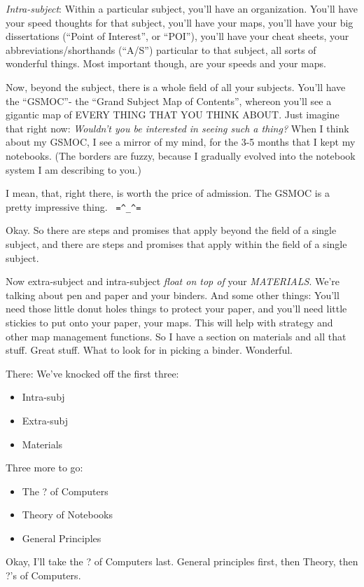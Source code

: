 \documentclass[oneside]{book}
\begin{document}
\emph{Intra-subject}: Within a particular subject, you'll have an
organization. You'll have your speed thoughts for that subject, you'll
have your maps, you'll have your big dissertations (``Point of
Interest'', or ``POI''), you'll have your cheat sheets, your
abbreviations/shorthands (``A/S'') particular to that subject, all sorts
of wonderful things. Most important though, are your speeds and your
maps.


Now, beyond the subject, there is a whole field of all your
subjects. You'll have the ``GSMOC''- the ``Grand Subject Map of
Contents'', whereon you'll see a gigantic map of EVERY THING THAT YOU
THINK ABOUT. Just imagine that right now: \emph{Wouldn't you be interested
in seeing such a thing?} When I think about my GSMOC, I see a mirror
of my mind, for the 3-5 months that I kept my notebooks. (The borders
are fuzzy, because I gradually evolved into the notebook system I am
describing to you.)

I mean, that, right there, is worth the price of admission. The GSMOC
is a pretty impressive thing. \verb| =^_^= |

Okay. So there are steps and promises that apply beyond the field of a
single subject, and there are steps and promises that apply within the
field of a single subject.

Now extra-subject and intra-subject \emph{float on top of} your
\emph{MATERIALS}. We're talking about pen and paper and your binders. And
some other things: You'll need those little donut holes things to
protect your paper, and you'll need little stickies to put onto your
paper, your maps. This will help with strategy and other map
management functions. So I have a section on materials and all that
stuff. Great stuff. What to look for in picking a binder. Wonderful.

There: We've knocked off the first three:
\begin{itemize}
\item Intra-subj
\item Extra-subj
\item Materials
\end{itemize}

Three more to go:
\begin{itemize}
\item The ? of Computers
\item Theory of Notebooks
\item General Principles
\end{itemize}

Okay, I'll take the ? of Computers last. General principles first,
then Theory, then ?'s of Computers.
\end{document}
